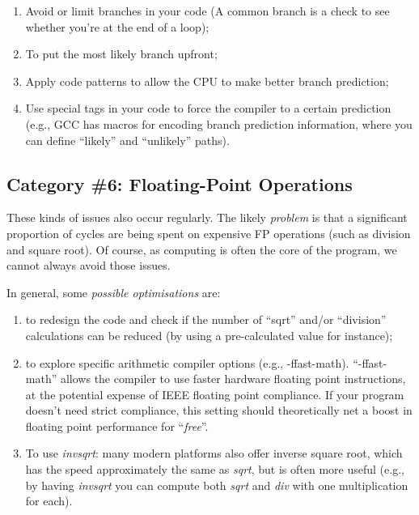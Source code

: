 \begin{enumerate}
  \item  Avoid or limit branches in your code (A common branch is a check to see whether you're at the end of a loop);
  \item  To put the most likely branch upfront;
  \item  Apply code patterns to allow the CPU to make better branch prediction;
  \item  Use special tags in your code to force the compiler to a certain prediction (e.g., GCC has macros for encoding branch prediction information, where you can define ``likely'' and ``unlikely'' paths).
\end{enumerate}

\subsection{Category \#6: Floating-Point Operations}
\label{subsec:CAT6_Optimizing_FP_Operations}

These kinds of issues also occur regularly. The likely \emph{problem} is that a significant proportion of cycles are being spent on expensive FP operations (such as division and square root). Of course, as computing is often the core of the program, we cannot always avoid those issues.



In general, some \emph{possible optimisations} are:

\begin{enumerate}
  \item  to redesign the code and check if the number of ``sqrt'' and/or ``division'' calculations can be reduced (by using a pre-calculated value for instance);
  \item  to explore specific arithmetic compiler options (e.g., -ffast-math). ``-ffast-math'' allows the compiler to use faster hardware floating point instructions, at the potential expense of IEEE floating point compliance. If your program doesn't need strict compliance, this setting should theoretically net a boost in floating point performance for ``\textit{free}''.
  \item  To use \textit{invsqrt}: many modern platforms also offer inverse square root, which has the speed approximately the same as \textit{sqrt}, but is often more useful (e.g., by having \textit{invsqrt} you can compute both \textit{sqrt} and \textit{div} with one multiplication for each).
\end{enumerate}

